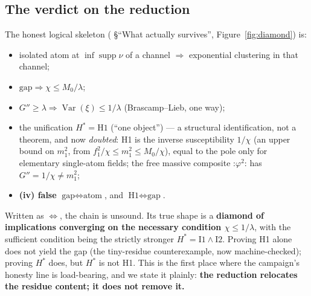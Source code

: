 \subsection{The verdict on the reduction}

The honest logical skeleton ( \S``What actually survives'',
Figure~\ref{fig:diamond}) is:

\begin{itemize}
\item \LT{} isolated atom at $\inf\operatorname{supp}\nu$ of a channel $\Rightarrow$ exponential
  clustering in that channel;
\item \LT{} $\text{gap}\Rightarrow\chi\le M_0/\lambda$;
\item \LT{} $G''\ge\lambda\Rightarrow\operatorname{Var}(\xi)\le1/\lambda$ (Brascamp--Lieb, one way);
\item \LC{} the unification $H^*=\text{H1}$ (``one object'') --- a structural identification,
  not a theorem, and now \emph{doubted}: H1 is the inverse susceptibility $1/\chi$ (an upper bound
  on $m_1^2$, from $f_1^2/\chi\le m_1^2\le M_0/\chi$), equal to the pole only for elementary
  single-atom fields; the free massive composite $\mathord{:}\varphi^2\mathord{:}$ has
  $G''=1/\chi\ne m_1^2$;
\item \textbf{(iv) false} $\text{gap}\iff\text{atom}$, and $\text{H1}\iff\text{gap}$.
\end{itemize}

Written as $\iff$, the chain is unsound. Its true shape is a \textbf{diamond of implications
converging on the necessary condition $\chi\le1/\lambda$}, with the sufficient condition being
the strictly stronger $H^*=\text{I1}\wedge\text{I2}$. Proving H1 alone does not yield the gap
(the tiny-residue counterexample, now machine-checked); proving $H^*$ does, but $H^*$ is not H1.
This is the first place where the campaign's honesty line is load-bearing, and we state it
plainly: \textbf{the reduction relocates the residue content; it does not remove it.}
